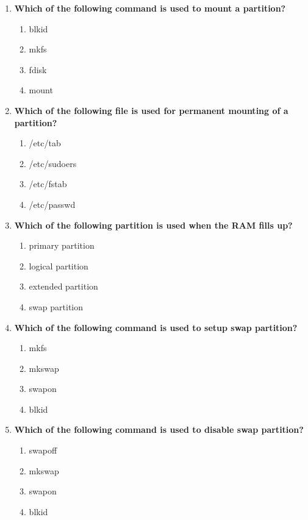 \begin{flushleft}
\begin{enumerate}
		\item \textbf{Which of the following command is used to mount a partition?}
		\begin{enumerate}[label=(\alph*)]
			\item blkid  
			\item mkfs  
			\item fdisk
			\item mount   %
		\end{enumerate}
		\bigskip
		\bigskip	

		\item \textbf{Which of the following file is used for permanent mounting of a partition?}
		\begin{enumerate}[label=(\alph*)]
			\item /etc/tab
			\item /etc/sudoers
			\item /etc/fstab   %
			\item /etc/passwd 
		\end{enumerate}
		\bigskip
		\bigskip	

		\item \textbf{Which of the following partition is used when the RAM fills up?}
			\begin{enumerate}[label=(\alph*)]
				\item primary partition
				\item logical partition  
				\item extended partition 
				\item swap partition   %
			\end{enumerate}
			\bigskip
			\bigskip

		\item \textbf{Which of the following command is used to setup swap partition?}
		\begin{enumerate}[label=(\alph*)]
			\item mkfs
			\item mkswap   %
			\item swapon   %
			\item blkid
		\end{enumerate}
		\bigskip
		\bigskip

		\item \textbf{Which of the following command is used to disable swap partition?}
		\begin{enumerate}[label=(\alph*)]
			\item swapoff  %
			\item mkswap   
			\item swapon   
			\item blkid
		\end{enumerate}
		\bigskip
		\bigskip
		
	\end{enumerate}
	
	
\end{flushleft}

\newpage

\afterpage{\blankpage}
